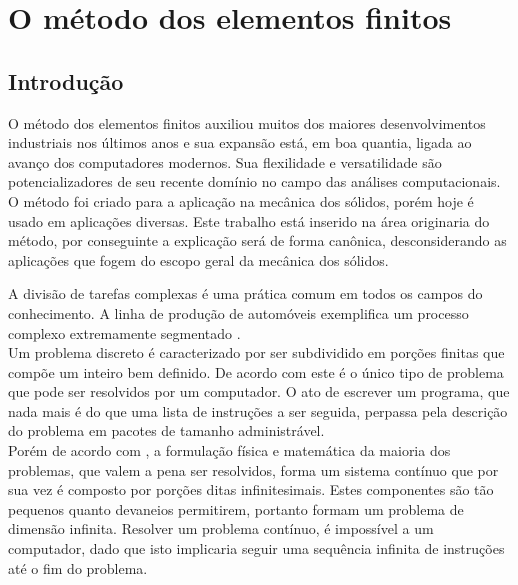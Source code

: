 \chapter{O método dos elementos finitos}

\section{Introdução}
O método dos elementos finitos auxiliou muitos dos maiores desenvolvimentos industriais nos últimos anos e sua expansão está, em boa quantia, ligada ao avanço dos computadores modernos. Sua flexilidade e versatilidade são potencializadores de seu recente domínio no campo das análises computacionais. O método foi criado para a aplicação na mecânica dos sólidos, porém hoje é usado em aplicações diversas. Este trabalho está inserido na área originaria do método, por conseguinte a explicação será de forma canônica, desconsiderando as aplicações que fogem do escopo geral da mecânica dos sólidos. \\

A divisão de tarefas complexas é uma prática comum em todos os campos do conhecimento. A linha de produção de automóveis exemplifica um processo complexo extremamente segmentado .\\ Um problema discreto é caracterizado por ser subdividido em porções finitas que compõe um inteiro bem definido. De acordo com \cite{zienkiewicz2013} este é o único tipo de problema que pode ser resolvidos por um computador. O ato de escrever um programa, que nada mais é do que uma lista de instruções a ser seguida, perpassa pela descrição do problema em pacotes de tamanho administrável. \\

Porém de acordo com \cite{zienkiewicz2013}, a formulação física e matemática da maioria dos problemas, que valem a pena ser resolvidos, forma um sistema contínuo que por sua vez é composto por porções ditas infinitesimais. Estes componentes são tão pequenos quanto devaneios permitirem, portanto formam um problema de dimensão infinita. Resolver um problema contínuo, é impossível a um computador, dado que isto implicaria seguir uma sequência infinita de instruções até o fim do problema. \\ 

